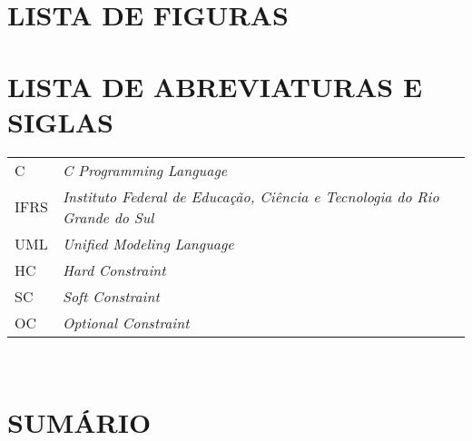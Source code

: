 \documentclass[12pt,a4paper]{article}
\begin{document}
	\listoftables

	\newpage

	\thispagestyle{empty}
	\section*{LISTA DE FIGURAS}

	\listoffigures

	\newpage


	\thispagestyle{empty}
	\section*{LISTA DE ABREVIATURAS E SIGLAS}

	\begin{tabular}{p{3cm} p{}}
	  C & \textit{C Programming Language} \\
	  IFRS & \textit{Instituto Federal de Educação, Ciência e Tecnologia do Rio Grande do Sul} \\
	  UML & \textit{Unified Modeling Language} \\
	  HC & \textit{Hard Constraint} \\
	  SC & \textit{Soft Constraint} \\
	  OC & \textit{Optional Constraint}
	\end{tabular}\\


	\newpage





	\thispagestyle{empty}
	\section*{SUMÁRIO}

	\begingroup
		\let\clearpage\relax
		\vspace{-1cm} %
		\tableofcontents
	\endgroup
\end{document}
